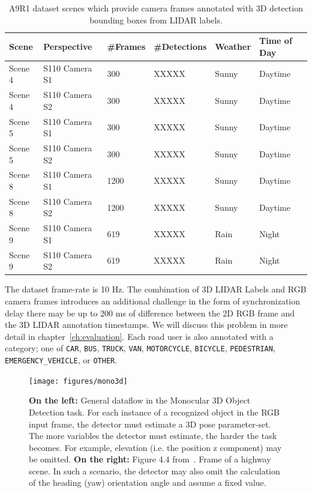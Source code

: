 \begin{table}[h]
    \centering
    \caption{A9R1 dataset scenes which provide camera frames annotated with 3D detection bounding boxes from LIDAR labels.}
    \label{tab:a9r1}
    \begin{tabular}{llllll}
        \toprule
        Scene & Perspective & \#Frames & \#Detections & Weather & Time of Day \\
        \midrule
        Scene 4 & S110 Camera S1 & 300 & XXXXX & Sunny & Daytime \\
        Scene 4 & S110 Camera S2 & 300 & XXXXX & Sunny & Daytime \\
        \midrule
        Scene 5 & S110 Camera S1 & 300 & XXXXX & Sunny & Daytime \\
        Scene 5 & S110 Camera S2 & 300 & XXXXX & Sunny & Daytime \\
        \midrule
        Scene 8 & S110 Camera S1 & 1200 & XXXXX & Sunny & Daytime \\
        Scene 8 & S110 Camera S2 & 1200 & XXXXX & Sunny & Daytime \\
        \midrule
        Scene 9 & S110 Camera S1 & 619 & XXXXX & Rain & Night \\
        Scene 9 & S110 Camera S2 & 619 & XXXXX & Rain & Night \\
        \bottomrule
    \end{tabular}
\end{table}

The dataset frame-rate is 10 Hz. The combination of 3D LIDAR Labels and RGB camera frames introduces an additional challenge in the form of synchronization delay \textemdash there may be up to 200 ms of difference between the 2D RGB frame and the 3D LIDAR annotation timestamps.
We will discuss this problem in more detail in chapter~\ref{ch:evaluation}.
Each road user is also annotated with a category; one of \texttt{CAR}, \texttt{BUS}, \texttt{TRUCK}, \texttt{VAN}, \texttt{MOTORCYCLE}, \texttt{BICYCLE}, \texttt{PEDESTRIAN}, \texttt{EMERGENCY\_VEHICLE}, or \texttt{OTHER}.


\begin{figure}[htb]
    \texttt{[image: figures/mono3d]}
    \caption{\textbf{On the left:} General dataflow in the Monocular 3D Object Detection task. For each instance of a recognized object in the RGB input frame, the detector must estimate a 3D pose parameter-set. The more variables the detector must estimate, the harder the task becomes. For example, elevation (i.e. the position z component) may be omitted. \textbf{On the right:} Figure 4.4 from~\cite{leonthesis}. Frame of a highway scene. In such a scenario, the detector may also omit the calculation of the heading (yaw) orientation angle and assume a fixed value.}
    \label{fig:mono3d-task-overview}
\end{figure}

